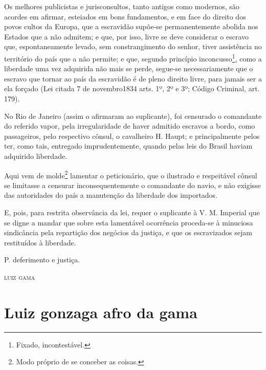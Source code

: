 Os melhores publicistas e jurisconsultos, tanto antigos como modernos,
são acordes em afirmar, esteiados em bons fundamentos, e em face do
direito dos povos cultos da Europa, que a escravidão supõe-se
permanentemente abolida nos Estados que a não admitem; e que, por isso,
livre se deve considerar o escravo que, espontaneamente levado, sem
constrangimento do senhor, tiver assistência no território do país que a
não permite; e que, segundo princípio inconcusso\footnote{ Fixado,
  incontestável.}, como a liberdade uma vez adquirida não mais se perde,
segue-se necessariamente que o escravo que tornar ao país da escravidão
é de pleno direito livre, para jamais ser a ela forçado (Lei citada 7 de
novembro1834 arts. 1º, 2º e 3º; Código Criminal, art. 179).

No Rio de Janeiro (assim o afirmaram ao suplicante), foi censurado o
comandante do referido vapor, pela irregularidade de haver admitido
escravos a bordo, como passageiros, pelo respectivo cônsul, o cavalheiro
H. Haupt; e principalmente pelos ter, como tais, entregado
imprudentemente, quando pelas leis do Brasil haviam adquirido liberdade.

Aqui vem de molde\footnote{ Modo próprio de se conceber as coisas.}
lamentar o peticionário, que o ilustrado e respeitável cônsul se
limitasse a censurar inconsequentemente o comandante do navio, e não
exigisse das autoridades do país a manutenção da liberdade dos
importados.

E, pois, para restrita observância da lei, requer o suplicante à V. M.
Imperial que se digne a mandar que sobre esta lamentável ocorrência
proceda-se à minuciosa sindicância pela repartição dos negócios da
justiça, e que os escravizados sejam restituídos à liberdade.

P. deferimento e justiça.

\begin{flushright}
\textsc{luiz gama}
\end{flushright}

\part{Luiz gonzaga afro da gama}

